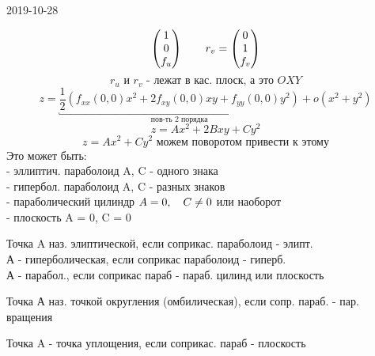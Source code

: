 \documentclass[12pt, fleqn]{article}
\begin{document}
\begin{lect}{2019-10-28}
\begin{Definition}
\[\begin{pmatrix}
            1\\
            0\\
            f_u
        \end{pmatrix} \qquad r_v = \begin{pmatrix}
            0\\
            1\\
            f_v
        \end{pmatrix}\]
        \[r_u \text{ и } r_v \text{ - лежат в кас. плоск, а это } OXY\]
        \[z = \underbracket{\frac{1}{2}(f_{xx}(0, 0)x^2 + 2f_{xy}(0, 0)xy +
            f_{yy}(0, 0)y^2) }_{\text{пов-ть 2 порядка}} +
        o(x^2 + y^2)\]
        \[z = Ax^2 + 2Bxy + Cy^2\]
        \[z = Ax^2 + Cy^2 \text{ можем поворотом привести к этому}\]
        Это может быть: \\
        - эллиптич. параболоид \qq\q A, C - одного знака\\
        - гипербол. параболоид \qq\q A, C - разных знаков\\
        - параболический цилиндр \qq $A = 0, \quad C \neq 0$ или наоборот\\
        - плоскость \qq\qq\qq A = 0, \q C = 0
    \end{Definition}

    \begin{definition}
        Точка A наз. элиптической, если соприкас. параболоид - элипт.\\
        А - гиперболическая, если соприкас параболоид - гиперб.\\
        А - парабол., если соприкас параб - параб. цилинд или плоскость
    \end{definition}

    \begin{definition}
        Точка А наз. точкой округления (омбилическая), если сопр. параб. - пар. вращения
    \end{definition}

    \begin{definition}
        Точка A - точка уплощения, если соприкас. параб - плоскость
    \end{definition}


\end{lect}
\end{document}
